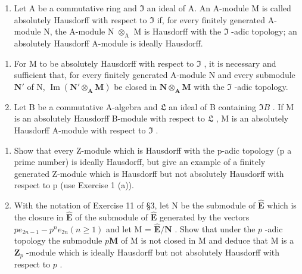 
\begin{enumerate}
\def\labelenumi{\arabic{enumi}.}
\tightlist
\item
  Let A be a commutative ring and \(\mathfrak{I}\) an ideal of A. An A-module M is called absolutely Hausdorff with respect to \(\mathfrak{I}\) if, for every finitely generated A-module N, the A-module N \(\otimes_{\mathrm{A}}\) M is Hausdorff with the \(\mathfrak{I}\) -adic topology; an absolutely Hausdorff A-module is ideally Hausdorff.
\end{enumerate}

\begin{enumerate}
\def\labelenumi{(\alph{enumi})}
\item
  For M to be absolutely Hausdorff with respect to \(\mathfrak{I}\) , it is necessary and sufficient that, for every finitely generated A-module N and every submodule \(\mathbf{N}'\) of N, \(\operatorname{Im}(\mathbf{N}' \otimes_{\mathbf{A}} \mathbf{M})\) be closed in \(\mathbf{N} \otimes_{\mathbf{A}} \mathbf{M}\) with the \(\mathfrak{I}\) -adic topology.
\item
  Let B be a commutative A-algebra and \(\mathfrak{L}\) an ideal of B containing \(\mathfrak{I}B\) . If M is an absolutely Hausdorff B-module with respect to \(\mathfrak{L}\) , M is an absolutely Hausdorff A-module with respect to \(\mathfrak{I}\) .
\end{enumerate}

\begin{enumerate}
\def\labelenumi{\arabic{enumi}.}
\setcounter{enumi}{1}
\item
  Show that every Z-module which is Hausdorff with the p-adic topology (p a prime number) is ideally Hausdorff, but give an example of a finitely generated Z-module which is Hausdorff but not absolutely Hausdorff with respect to p (use Exercise 1 (a)).
\item
  With the notation of Exercise 11 of §3, let N be the submodule of \(\hat{\mathbf{E}}\) which is the closure in \(\hat{\mathbf{E}}\) of the submodule of \(\hat{\mathbf{E}}\) generated by the vectors \(pe_{2n-1} - p^n e_{2n} (n \geqslant 1)\) and let M = \(\hat{\mathbf{E}}/\mathbf{N}\) . Show that under the \(p\) -adic topology the submodule \(p\mathbf{M}\) of M is not closed in M and deduce that M is a \(\mathbf{Z}_p\) -module which is ideally Hausdorff but not absolutely Hausdorff with respect to \(p\) .
\end{enumerate}


